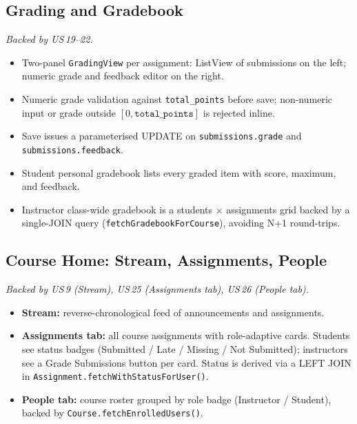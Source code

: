 \documentclass[12pt, a4paper]{article}
\begin{document}
{\subsection{Grading and Gradebook}
\textit{Backed by US\,19--22.}
\begin{itemize}
  \item Two-panel \texttt{GradingView} per assignment: ListView of submissions
        on the left; numeric grade and feedback editor on the right.
  \item Numeric grade validation against \texttt{total\_points} before save;
        non-numeric input or grade outside $[0, \texttt{total\_points}]$ is rejected inline.
  \item Save issues a parameterised UPDATE on \texttt{submissions.grade} and
        \texttt{submissions.feedback}.
  \item Student personal gradebook lists every graded item with score,
        maximum, and feedback.
  \item Instructor class-wide gradebook is a students $\times$ assignments
        grid backed by a single-JOIN query (\texttt{fetchGradebookForCourse}),
        avoiding N+1 round-trips.
\end{itemize}

\subsection{Course Home: Stream, Assignments, People}
\textit{Backed by US\,9 (Stream), US\,25 (Assignments tab), US\,26 (People tab).}
\begin{itemize}
  \item \textbf{Stream:} reverse-chronological feed of announcements and assignments.
  \item \textbf{Assignments tab:} all course assignments with role-adaptive
        cards. Students see status badges (Submitted / Late / Missing / Not
        Submitted); instructors see a Grade Submissions button per card.
        Status is derived via a LEFT JOIN in
        \texttt{Assignment.fetchWithStatusForUser()}.
  \item \textbf{People tab:} course roster grouped by role badge (Instructor /
        Student), backed by \texttt{Course.fetchEnrolledUsers()}.
\end{itemize}

}
\end{document}
